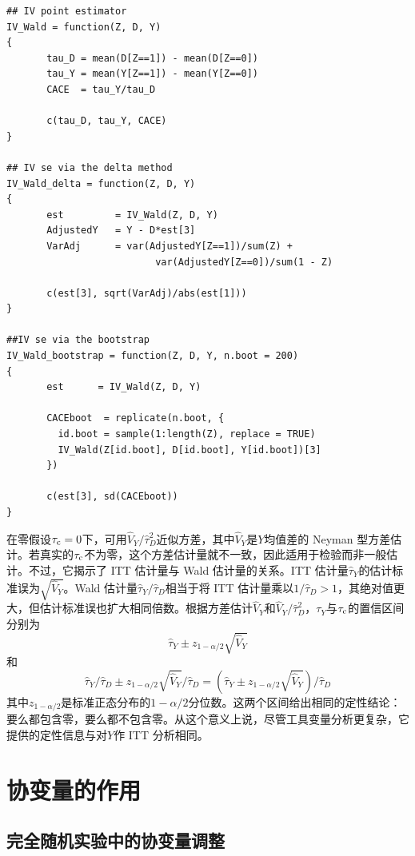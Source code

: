 \begin{lstlisting}
## IV point estimator
IV_Wald = function(Z, D, Y)
{
       tau_D = mean(D[Z==1]) - mean(D[Z==0])
       tau_Y = mean(Y[Z==1]) - mean(Y[Z==0])
       CACE  = tau_Y/tau_D
       
       c(tau_D, tau_Y, CACE)
}

## IV se via the delta method
IV_Wald_delta = function(Z, D, Y)
{
       est         = IV_Wald(Z, D, Y)
       AdjustedY   = Y - D*est[3]
       VarAdj      = var(AdjustedY[Z==1])/sum(Z) + 
                          var(AdjustedY[Z==0])/sum(1 - Z)
       
       c(est[3], sqrt(VarAdj)/abs(est[1]))
}

##IV se via the bootstrap
IV_Wald_bootstrap = function(Z, D, Y, n.boot = 200)
{
       est      = IV_Wald(Z, D, Y)
       
       CACEboot  = replicate(n.boot, {
         id.boot = sample(1:length(Z), replace = TRUE)
         IV_Wald(Z[id.boot], D[id.boot], Y[id.boot])[3]
       })
       
       c(est[3], sd(CACEboot))
}
\end{lstlisting}


在零假设$\tau_{\textup{c}} = 0$下，可用$\hat{V}_Y /  \hat{\tau}_D ^2$近似方差，其中$\hat{V}_Y$是$Y$均值差的 Neyman 型方差估计。若真实的$\tau_{\textup{c}}$不为零，这个方差估计量就不一致，因此适用于检验而非一般估计。不过，它揭示了 ITT 估计量与 Wald 估计量的关系。ITT 估计量$\hat{\tau}_Y$的估计标准误为$\sqrt{ \hat{V}_Y}$。Wald 估计量$ \hat{\tau}_Y / \hat{\tau}_D$相当于将 ITT 估计量乘以$1/\hat{\tau}_D > 1$，其绝对值更大，但估计标准误也扩大相同倍数。根据方差估计$\hat{V}_Y $和$\hat{V}_Y /  \hat{\tau}_D ^2$，$\tau_Y$与$\tau_{\textup{c}}$的置信区间分别为
$$
\hat{\tau}_Y \pm z_{1-\alpha/2} \sqrt{ \hat{V}_Y}
$$
和
$$
\hat{\tau}_Y  / \hat{\tau}_D \pm z_{1-\alpha/2} \sqrt{ \hat{V}_Y}  / \hat{\tau}_D
= 
\left( \hat{\tau}_Y \pm z_{1-\alpha/2} \sqrt{ \hat{V}_Y}  \right) / \hat{\tau}_D 
$$
其中$z_{1-\alpha/2}$是标准正态分布的$1-\alpha/2$分位数。这两个区间给出相同的定性结论：要么都包含零，要么都不包含零。从这个意义上说，尽管工具变量分析更复杂，它提供的定性信息与对$Y$作 ITT 分析相同。  




\section{协变量的作用}

\subsection{完全随机实验中的协变量调整}

